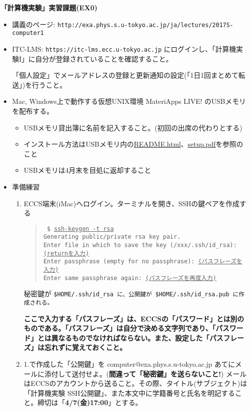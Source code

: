\documentclass[11pt]{jarticle}
\begin{document}
\noindent
{\bf\large 「計算機実験」実習課題(EX0)}
\\[-0.5em]

\noindent
\begin{itemize}
\item 講義のページ: \verb+http://exa.phys.s.u-tokyo.ac.jp/ja/lectures/2017S-computer1+
\item ITC-LMS: \verb+https://itc-lms.ecc.u-tokyo.ac.jp+ にログインし、「計算機実験I」に自分が登録されていることを確認すること。

  「個人設定」でメールアドレスの登録と更新通知の設定(「1日1回まとめて転送」)を行うこと。
\item Mac, Windows上で動作する仮想UNIX環境 MateriApps LIVE! のUSBメモリを配布する。
  \begin{itemize}
  \item USBメモリ貸出簿に名前を記入すること。(初回の出席の代わりとする)
  \item インストール方法はUSBメモリ内の\href{https://github.com/cmsi/MateriAppsLive/wiki/MateriAppsLive-ltx}{README.html}、\href{https://github.com/cmsi/MateriAppsLive-setup/blob/master/ova/setup.pdf}{setup.pdf}を参照のこと
  \item USBメモリは4月末を目処に返却すること
  \end{itemize}

\item 準備練習
  \begin{enumerate}
  \item ECCS端末(iMac)へログイン。ターミナルを開き、SSHの鍵ペアを作成する
    \begin{quote} \tt
      \$ \underline{ssh-keygen -t rsa} \\
      Generating public/private rsa key pair.\\
      Enter file in which to save the key (/xxx/.ssh/id\_rsa): \underline{(returnを入力)}\\
      Enter passphrase (empty for no passphrase): \underline{(パスフレーズを入力)}\\
      Enter same passphrase again: \underline{(パスフレーズを再度入力)}
    \end{quote}
    秘密鍵が \tt{\$HOME/.ssh/id\_rsa} に、公開鍵が \tt{\$HOME/.ssh/id\_rsa.pub} に作成される。
    
    {\bf ここで入力する「パスフレーズ」は、ECCSの「パスワード」とは別のものである。「パスフレーズ」は自分で決める文字列であり、「パスワード」とは異なるものでなければならない。また、設定した「パスフレーズ」は忘れずに覚えておくこと。}
  \item 1.で作成した「公開鍵」を computer@exa.phys.s.u-tokyo.ac.jp あてにメールに添付して送付せよ。({\bf 間違って「秘密鍵」を送らないこと!}) メールはECCSのアカウントから送ること。その際、タイトル(サブジェクト)は「計算機実験 SSH公開鍵」、また本文中に学籍番号と氏名を明記すること。締切は「{\bf 4/7(金)17:00}」とする。


\end{enumerate}
\end{itemize}
\end{document}
